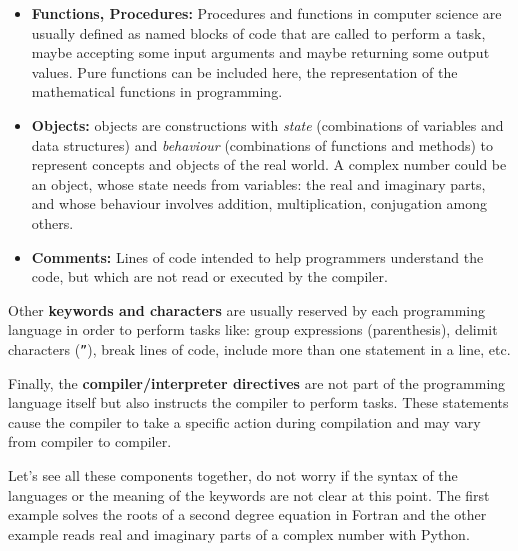 \begin{itemize}[noitemsep]
    \item \textbf{Functions, Procedures:} Procedures and functions in computer science are usually defined as 
    named blocks of code that are called to perform a task, maybe accepting some input arguments and maybe returning some output values. 
    Pure functions can be included here, the representation of the mathematical functions in programming. 
    
    \item \textbf{Objects:} objects are constructions with 
    \textit{state} (combinations of variables and data structures) and 
    \textit{behaviour} (combinations of functions and methods) 
    to represent concepts and objects of the real world. 
    A complex number could be an object, 
    whose state needs from variables: the real and imaginary parts, and 
    whose behaviour involves addition, multiplication, conjugation among others. 
    
    \item \textbf{Comments:} Lines of code intended to help programmers understand the code, 
    but which are not read or executed by the compiler.
\end{itemize}
\vspace{-0.5cm}
Other \textbf{keywords and characters} are usually reserved by each programming language 
in order to perform tasks like: 
group expressions (parenthesis), 
delimit characters (\texttt{''}), 
break lines of code, 
include more than one statement in a line, etc.

Finally, the \textbf{compiler/interpreter directives} are not part of the programming language itself 
but also instructs the compiler to perform tasks. 
These statements cause the compiler to take a specific action during compilation and 
may vary from compiler to compiler.


Let's see all these components together, 
do not worry if the syntax of the languages or 
the meaning of the keywords are not clear at this point. 
The first example solves the roots of a second degree equation in Fortran and 
the other example reads real and imaginary parts of a complex number with Python.

